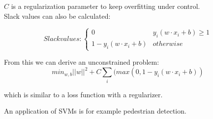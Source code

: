 $C$ is a regularization parameter to keep overfitting under control.\\
Slack values can also be calculated: 

\begin{equation}
Slack values:
	\begin{cases}
	0 &  y_i (w\cdot x_i + b) \geq 1 \\
			1- y_i (w\cdot x_i + b) & otherwise
	\end{cases}
\end{equation}

From this we can derive an unconstrained problem: 
\[
min_{w,b} ||w||^2 +C\sum_{i}(max(0,1-y_i (w\cdot x_i + b))
\]

which is similar to a loss function with a regularizer.

An application of SVMs is for example pedestrian detection. 
